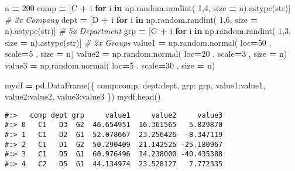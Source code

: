 \documentclass[
]{book}
\newenvironment{Shaded}{\begin{snugshade}}{\end{snugshade}}
\newcommand{\BuiltInTok}[1]{#1}
\newcommand{\CommentTok}[1]{\textcolor[rgb]{0.37,0.37,0.37}{\textit{#1}}}
\newcommand{\ControlFlowTok}[1]{\textcolor[rgb]{0.27,0.27,0.27}{\textbf{#1}}}
\newcommand{\DecValTok}[1]{\textcolor[rgb]{0.06,0.06,0.06}{#1}}
\newcommand{\KeywordTok}[1]{\textcolor[rgb]{0.27,0.27,0.27}{\textbf{#1}}}
\newcommand{\NormalTok}[1]{#1}
\newcommand{\OperatorTok}[1]{\textcolor[rgb]{0.43,0.43,0.43}{\textbf{#1}}}
\newcommand{\StringTok}[1]{\textcolor[rgb]{0.5,0.5,0.5}{#1}}
\begin{document}
\begin{Shaded}
\begin{Highlighting}[]
\NormalTok{n }\OperatorTok{=} \DecValTok{200}
\NormalTok{comp }\OperatorTok{=}\NormalTok{ [}\StringTok{\textquotesingle{}C\textquotesingle{}} \OperatorTok{+}\NormalTok{ i }\ControlFlowTok{for}\NormalTok{ i }\KeywordTok{in}\NormalTok{ np.random.randint( }\DecValTok{1}\NormalTok{,}\DecValTok{4}\NormalTok{, size  }\OperatorTok{=}\NormalTok{ n).astype(}\BuiltInTok{str}\NormalTok{)] }\CommentTok{\# 3x Company}
\NormalTok{dept }\OperatorTok{=}\NormalTok{ [}\StringTok{\textquotesingle{}D\textquotesingle{}} \OperatorTok{+}\NormalTok{ i }\ControlFlowTok{for}\NormalTok{ i }\KeywordTok{in}\NormalTok{ np.random.randint( }\DecValTok{1}\NormalTok{,}\DecValTok{6}\NormalTok{, size  }\OperatorTok{=}\NormalTok{ n).astype(}\BuiltInTok{str}\NormalTok{)] }\CommentTok{\# 5x Department}
\NormalTok{grp }\OperatorTok{=}\NormalTok{  [}\StringTok{\textquotesingle{}G\textquotesingle{}} \OperatorTok{+}\NormalTok{ i }\ControlFlowTok{for}\NormalTok{ i }\KeywordTok{in}\NormalTok{ np.random.randint( }\DecValTok{1}\NormalTok{,}\DecValTok{3}\NormalTok{, size  }\OperatorTok{=}\NormalTok{ n).astype(}\BuiltInTok{str}\NormalTok{)] }\CommentTok{\# 2x Groups}
\NormalTok{value1 }\OperatorTok{=}\NormalTok{ np.random.normal( loc}\OperatorTok{=}\DecValTok{50}\NormalTok{ , scale}\OperatorTok{=}\DecValTok{5}\NormalTok{ , size }\OperatorTok{=}\NormalTok{ n)}
\NormalTok{value2 }\OperatorTok{=}\NormalTok{ np.random.normal( loc}\OperatorTok{=}\DecValTok{20}\NormalTok{ , scale}\OperatorTok{=}\DecValTok{3}\NormalTok{ , size }\OperatorTok{=}\NormalTok{ n)}
\NormalTok{value3 }\OperatorTok{=}\NormalTok{ np.random.normal( loc}\OperatorTok{=}\DecValTok{5}\NormalTok{ , scale}\OperatorTok{=}\DecValTok{30}\NormalTok{ , size }\OperatorTok{=}\NormalTok{ n)}

\NormalTok{mydf }\OperatorTok{=}\NormalTok{ pd.DataFrame(\{}
    \StringTok{\textquotesingle{}comp\textquotesingle{}}\NormalTok{:comp, }
    \StringTok{\textquotesingle{}dept\textquotesingle{}}\NormalTok{:dept, }
    \StringTok{\textquotesingle{}grp\textquotesingle{}}\NormalTok{: grp,}
    \StringTok{\textquotesingle{}value1\textquotesingle{}}\NormalTok{:value1, }
    \StringTok{\textquotesingle{}value2\textquotesingle{}}\NormalTok{:value2,}
    \StringTok{\textquotesingle{}value3\textquotesingle{}}\NormalTok{:value3 \})}
\NormalTok{mydf.head()}
\end{Highlighting}
\end{Shaded}

\begin{verbatim}
#:>   comp dept grp     value1     value2     value3
#:> 0   C1   D3  G2  46.654951  16.361565   5.829870
#:> 1   C1   D2  G1  52.078667  23.256426  -8.347119
#:> 2   C1   D1  G2  50.290409  21.142525 -25.180967
#:> 3   C1   D5  G1  60.976496  14.238000 -40.435388
#:> 4   C2   D5  G1  44.134974  23.528127   7.772335
\end{verbatim}
\end{document}
